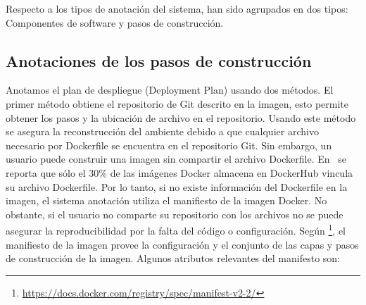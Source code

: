Respecto a los tipos de anotación del sistema, han sido agrupados en dos tipos: Componentes de software y pasos de construcción.


\subsection{Anotaciones de los pasos de construcción}\label{s4.2.1}

Anotamos el plan de despliegue (Deployment Plan) usando dos métodos. El primer método obtiene el repositorio de Git descrito en la imagen, esto permite obtener los pasos y la ubicación de archivo en el repositorio. 
Usando este método se asegura la reconstrucción del ambiente debido a que cualquier archivo necesario por Dockerfile se encuentra en el repositorio Git.
Sin embargo, un usuario puede construir una imagen sin compartir el archivo Dockerfile. En~\cite{DBLP:conf/semweb/OsorioAV18a} se reporta que sólo el 30\% de las imágenes Docker almacena en DockerHub vincula su archivo Dockerfile. 
Por lo tanto, si no existe información del Dockerfile en la imagen, el sistema anotación utiliza el manifiesto de la imagen Docker. 
No obstante, si el usuario no comparte su repositorio con los archivos no se puede asegurar la reproducibilidad por la falta del código o configuración.
Según \footnote{\url{https://docs.docker.com/registry/spec/manifest-v2-2/}}, el manifiesto de la imagen provee la configuración y el conjunto de las capas y pasos de construcción de la imagen.
Algunos atributos relevantes del manifesto son:

